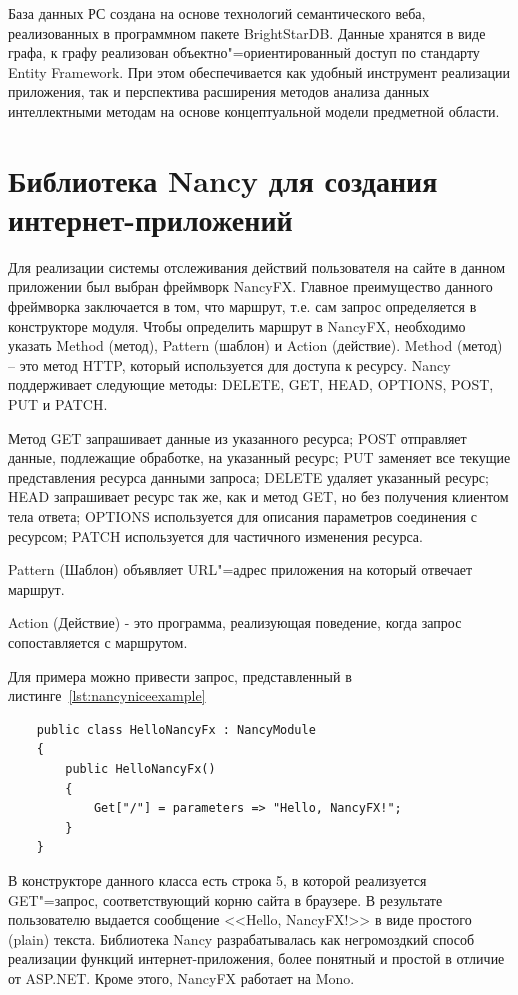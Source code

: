 \documentclass[a4paper,14pt,openany,final]{extreport} %
\def\oldcaption{} \let\oldcaption=\caption
\def\caption{\stepcounter{captionsnum}\oldcaption}
\begin{document}
База данных РС создана на основе технологий семантического веба, реализованных в программном пакете BrightStarDB. Данные хранятся в виде графа, к графу реализован объектно"=ориентированный доступ по стандарту Entity Framework. При этом обеспечивается как удобный инструмент реализации приложения, так и перспектива расширения методов анализа данных интеллектными методам на основе концептуальной модели предметной области.

\section{Библиотека Nancy для создания интернет-приложений}

Для реализации системы отслеживания действий пользователя на сайте в данном приложении был выбран фреймворк NancyFX. Главное преимущество данного фреймворка заключается в том, что маршрут, т.е. сам запрос определяется в конструкторе модуля. Чтобы определить маршрут в NancyFX, необходимо указать Method (метод), Pattern (шаблон) и Action (действие).
Method (метод) -- это метод HTTP, который используется для доступа к ресурсу. Nancy поддерживает следующие методы: DELETE, GET, HEAD, OPTIONS, POST, PUT и PATCH.

Метод GET запрашивает данные из указанного ресурса; POST отправляет данные, подлежащие обработке, на указанный ресурс; PUT заменяет все текущие представления ресурса данными запроса; DELETE удаляет указанный ресурс; HEAD запрашивает ресурс так же, как и метод GET, но без получения клиентом тела ответа; OPTIONS используется для описания параметров соединения с ресурсом; PATCH используется для частичного изменения ресурса.

Pattern (Шаблон) объявляет URL"=адрес приложения на который отвечает маршрут.

Action (Действие) - это программа, реализующая поведение, когда запрос сопоставляется с маршрутом.

Для примера можно привести запрос, представленный в листинге~\ref{lst:nancyniceexample}

\begin{pzlisting}
\caption{Пример \protect\textsc{GET}-запроса на NancyFX}\label{lst:nancyniceexample}
    \begin{verbatim}
    public class HelloNancyFx : NancyModule
    {
        public HelloNancyFx()
        {
            Get["/"] = parameters => "Hello, NancyFX!";
        }
    }
\end{verbatim}
\end{pzlisting}
В конструкторе данного класса есть строка 5, в которой реализуется GET"=запрос, соответствующий корню сайта в браузере. В результате пользователю выдается сообщение <<Hello, NancyFX!>> в виде простого (plain) текста. Библиотека Nancy разрабатывалась как негромоздкий способ реализации функций интернет-приложения, более понятный и простой в отличие от ASP.NET. Кроме этого, NancyFX работает на Mono. %
\end{document}

